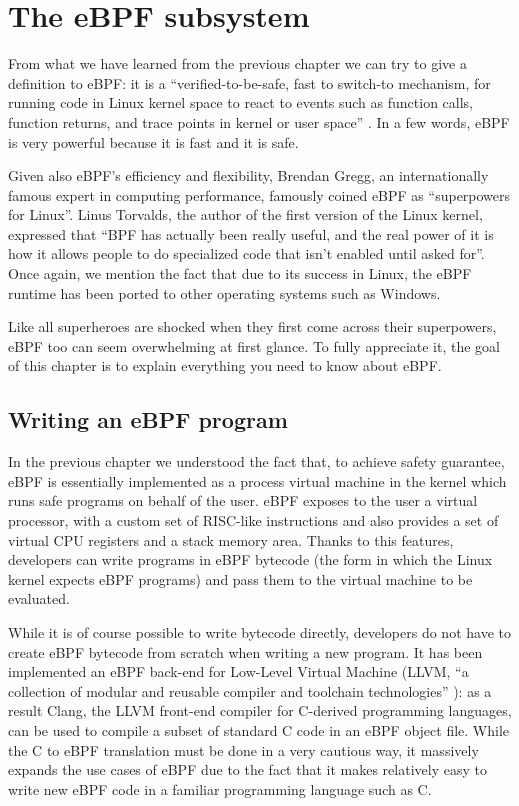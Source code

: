 \chapter{The eBPF subsystem}

From what we have learned from the previous chapter we can try to give a definition to eBPF: it is a ``verified-to-be-safe, fast to switch-to mechanism, for running code in Linux kernel space to react to events such as function calls, function returns, and trace points in kernel or user space'' \cite{eBPFLinuxJournal}.
In a few words, eBPF is very powerful because it is fast and it is safe. 

Given also eBPF's efficiency and flexibility, Brendan Gregg, an internationally famous expert in computing performance,  famously coined eBPF as ``superpowers for Linux''.
Linus Torvalds, the author of the first version of the Linux kernel, expressed that ``BPF has actually been really useful, and the real power of it is how it allows people to do specialized code that isn't enabled until asked for''.
Once again, we mention the fact that due to its success in Linux, the eBPF runtime has been ported to other operating systems such as Windows.

Like all superheroes are shocked when they first come across their superpowers, eBPF too can seem overwhelming at first glance.
To fully appreciate it, the goal of this chapter is to explain everything you need to know about eBPF.

\section{Writing an eBPF program}

In the previous chapter we understood the fact that, to achieve safety guarantee, eBPF is essentially implemented as a process virtual machine in the kernel which runs safe programs on behalf of the user.
eBPF exposes to the user a virtual processor, with a custom set of RISC-like instructions and also provides a set of virtual CPU registers and a stack memory area.
Thanks to this features, developers can write programs in eBPF bytecode (the form in which the Linux kernel expects eBPF programs) and pass them to the virtual machine to be evaluated.

While it is of course possible to write bytecode directly, developers do not have to create eBPF bytecode from scratch when writing a new program.
It has been implemented an eBPF back-end for Low-Level Virtual Machine (LLVM, ``a collection of modular and reusable compiler and toolchain technologies'' \cite{LLVMWebsite}): as a result Clang, the LLVM front-end compiler for C-derived programming languages, can be used to compile a subset of standard C code in an eBPF object file.
While the C to eBPF translation must be done in a very cautious way, it massively expands the use cases of eBPF due to the fact that it makes relatively easy to write new eBPF code in a familiar programming language such as C.

